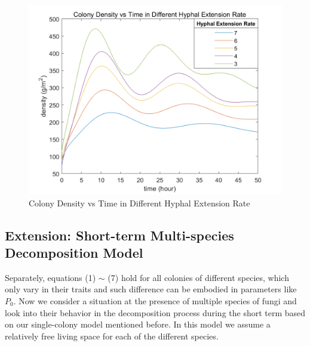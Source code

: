 \documentclass[12pt]{article}
\begin{document}
\begin{figure}[H]%
	\small
	\centering
	\includegraphics[width=14cm]{./pictures/model 1.png}
	\caption{Colony Density vs Time in Different Hyphal Extension Rate}\label{jj}
\end{figure}

\subsection{Extension: Short-term Multi-species Decomposition Model}
Separately, equations (1) $\sim$ (7) hold for all colonies of different species, which only vary in their traits and such difference can be embodied in parameters like $P_{0}$. Now we consider a situation at the presence of multiple species of fungi and look into their behavior in the decomposition process during the short term based on our single-colony model mentioned before. In this model we assume a relatively free living space for each of the different species. 
\end{document}
